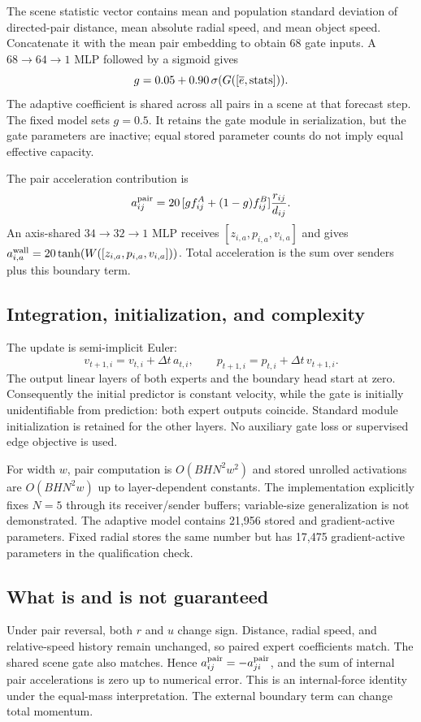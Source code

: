 \documentclass[10pt]{article}
\begin{document}
The scene statistic vector contains mean and population standard deviation of directed-pair distance, mean absolute radial speed, and mean object speed. Concatenate it with the mean pair embedding to obtain 68 gate inputs. A $68\to64\to1$ MLP followed by a sigmoid gives
\begin{equation}
 g=0.05+0.90\,\sigma(G([\overline{e},{\rm stats}])).
\end{equation}
The adaptive coefficient is shared across all pairs in a scene at that forecast step. The fixed model sets $g=0.5$. It retains the gate module in serialization, but the gate parameters are inactive; equal stored parameter counts do not imply equal effective capacity.

The pair acceleration contribution is
\begin{equation}
 a^{\rm pair}_{ij}=20\,[g f^A_{ij}+(1-g)f^B_{ij}]\frac{r_{ij}}{d_{ij}}.
\end{equation}
An axis-shared $34\to32\to1$ MLP receives $[z_{i,a},p_{i,a},v_{i,a}]$ and gives
$a^{\rm wall}_{i,a}=20\tanh(W([z_{i,a},p_{i,a},v_{i,a}]))$. Total acceleration is the sum over senders plus this boundary term.

\subsection{Integration, initialization, and complexity}
The update is semi-implicit Euler:
\begin{equation}
 v_{t+1,i}=v_{t,i}+\Delta t\,a_{t,i},\qquad
 p_{t+1,i}=p_{t,i}+\Delta t\,v_{t+1,i}.
\end{equation}
The output linear layers of both experts and the boundary head start at zero. Consequently the initial predictor is constant velocity, while the gate is initially unidentifiable from prediction: both expert outputs coincide. Standard module initialization is retained for the other layers. No auxiliary gate loss or supervised edge objective is used.

For width $w$, pair computation is $O(BHN^2w^2)$ and stored unrolled activations are $O(BHN^2w)$ up to layer-dependent constants. The implementation explicitly fixes $N=5$ through its receiver/sender buffers; variable-size generalization is not demonstrated. The adaptive model contains 21,956 stored and gradient-active parameters. Fixed radial stores the same number but has 17,475 gradient-active parameters in the qualification check.

\subsection{What is and is not guaranteed}
Under pair reversal, both $r$ and $u$ change sign. Distance, radial speed, and relative-speed history remain unchanged, so paired expert coefficients match. The shared scene gate also matches. Hence $a^{\rm pair}_{ij}=-a^{\rm pair}_{ji}$, and the sum of internal pair accelerations is zero up to numerical error. This is an internal-force identity under the equal-mass interpretation. The external boundary term can change total momentum.
\end{document}
